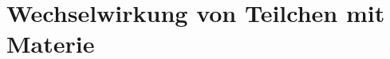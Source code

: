 \documentclass{article}
\begin{document}



\section{Wechselwirkung von Teilchen mit Materie}
% 		
% 				
% 				
% 				
% 				
% 				
% 				
% 				
% 				
\end{document}
